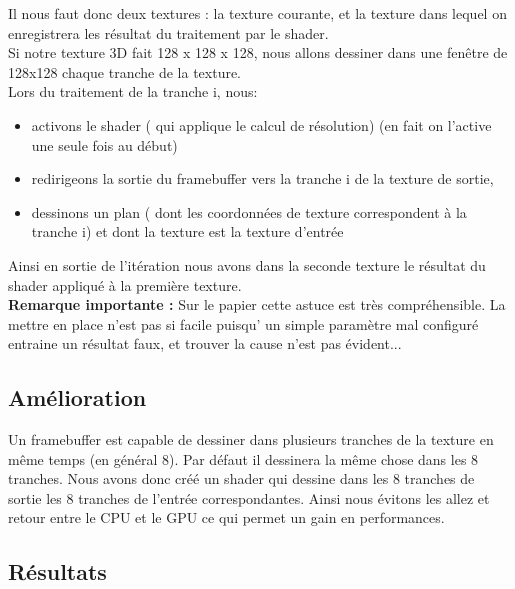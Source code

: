 \documentclass[a4paper,10pt]{article}
\begin{document}
Il nous faut donc deux textures : la texture courante, et la texture
dans lequel on enregistrera les résultat du traitement par le
shader.\\
 
Si notre texture 3D fait 128 x 128 x 128, nous allons dessiner dans une fenêtre
de 128x128 chaque tranche de la texture. \\
Lors du traitement de la tranche i, nous:\\
\begin{itemize}
\item activons le shader ( qui applique le calcul de résolution) (en
  fait on l'active une seule fois au début)\\
\item redirigeons la sortie du framebuffer vers la tranche i de la texture de sortie,\\
\item dessinons un plan ( dont les coordonnées de texture
  correspondent à la tranche i) et dont la texture est la texture
  d'entrée\\
\end{itemize}
Ainsi en sortie de l'itération nous avons dans la seconde texture le
résultat du shader appliqué à la première texture.\\
 
\textbf{Remarque importante : } Sur le papier cette astuce est très
compréhensible. La mettre en place n'est pas si facile puisqu' un
simple paramètre mal configuré entraine un résultat faux, et trouver
la cause n'est pas évident...
 
\subsection{Amélioration}
Un framebuffer est capable de dessiner dans plusieurs tranches de la
texture en même temps (en général 8). Par défaut il dessinera la même
chose dans les 8 tranches. Nous avons donc créé un shader qui dessine
dans les 8 tranches de sortie les 8 tranches de l'entrée
correspondantes. Ainsi nous évitons les allez et retour entre le CPU
et le GPU ce qui permet un gain en performances.


\subsection{Résultats}




\end{document}
